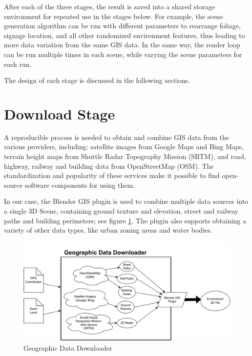 After each of the three stages, the result is saved into a shared storage environment for repeated use in the stages below. For example, the scene generation algorithm can be run with different parameters to rearrange foliage, signage location, and all other randomized environment features, thus leading to more data variation from the same GIS data. In the same way, the render loop can be run multiple times in each scene, while varying the scene parameters for each run.

The design of each stage is discussed in the following sections.

\section{Download Stage}
\label{sec:download-stage}

A reproducible process is needed to obtain and combine GIS data from the various providers, including: satellite images from Google Maps and Bing Maps, terrain height maps from Shuttle Radar Topography Mission (SRTM), and road, highway, railway and building data from OpenStreetMap (OSM). The standardization and popularity of these services make it possible to find open-source software components for using them. 

In our case, the Blender GIS plugin is used to combine multiple data sources into a single 3D Scene, containing ground texture and elevation, street and railway paths and building perimeters; see figure \ref{fig:design-data-downloader}. The plugin also supports obtaining a variety of other data types, like urban zoning areas and water bodies.

\begin{figure}[H]
    \centering
    \includegraphics[width=14.5cm]{src/img/fig/fig-2 Geographic Data Downloader.drawio.pdf}
    \caption{Geographic Data Downloader}

    \label{fig:design-data-downloader}
\end{figure}

